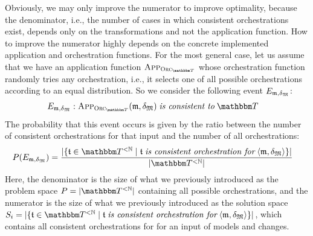 Obviously, we may only improve the numerator to improve optimality, because the denominator, i.e., the number of cases in which consistent orchestrations exist, depends only on the transformations and not the application function.
How to improve the numerator highly depends on the concrete implemented application and orchestration functions.
For the most general case, let us assume that we have an application function $\appfunction{\orcfunction{\transformationset{T}}}$ whose orchestration function randomly tries any orchestration, i.e., it selects one of all possible orchestrations according to an equal distribution.
So we consider the following event $E_{\mathfrak{m},\mathfrak{\delta}_{\mathfrak{M}}}$:
\begin{align*}
    &
    E_{\modeltuple{m},\changetuple{\metamodeltuple{M}}}: \appfunction{\orcfunction{\transformationset{T}}}(\modeltuple{m}, \changetuple{\metamodeltuple{M}}) \mathtext{is consistent to} \transformationset{T}
\end{align*}
The probability that this event occurs is given by the ratio between the number of consistent orchestrations for that input and the number of all orchestrations:
\begin{align*}
    &
    P(E_{\modeltuple{m},\changetuple{\metamodeltuple{M}}}) = \frac{
        \abs{\setted{\tuple{\transformation{t}} \in \transformationset{T}^{< \mathbb{N}} \mid \tuple{\transformation{t}} \mathtext{is consistent orchestration for} \tupled{\modeltuple{m}, \changetuple{\metamodeltuple{M}}}}}
    }{
        \abs{\transformationset{T}^{< \mathbb{N}}}
    }
\end{align*}
Here, the denominator is the size of what we previously introduced as the problem space $P = \abs{\transformationset{T}^{< \mathbb{N}}}$ containing all possible orchestrations, and the numerator is the size of what we previously introduced as the solution space $S_{i} = \abs{\setted{\tuple{\transformation{t}} \in \transformationset{T}^{< \mathbb{N}} \mid \tuple{\transformation{t}} \mathtext{is consistent orchestration for} \tupled{\modeltuple{m}, \changetuple{\metamodeltuple{M}}}}}$, which contains all consistent orchestrations for for an input of models and changes.

